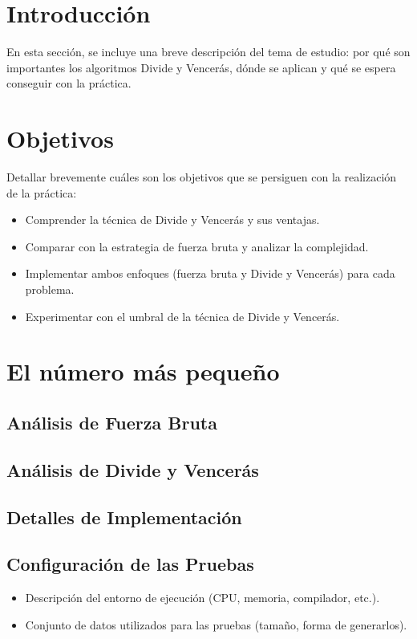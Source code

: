 \documentclass[a4paper,12pt]{article}
\begin{document}


\section{Introducción}
En esta sección, se incluye una breve descripción del tema de estudio:
por qué son importantes los algoritmos Divide y Vencerás,
dónde se aplican y qué se espera conseguir con la práctica.

\section{Objetivos}
Detallar brevemente cuáles son los objetivos que se persiguen con la realización de la práctica:
\begin{itemize}
	\item Comprender la técnica de Divide y Vencerás y sus ventajas.
	\item Comparar con la estrategia de fuerza bruta y analizar la complejidad.
	\item Implementar ambos enfoques (fuerza bruta y Divide y Vencerás) para cada problema.
	\item Experimentar con el umbral de la técnica de Divide y Vencerás.
\end{itemize}

\section{El número más pequeño}
\subsection{Análisis de Fuerza Bruta}

\subsection{Análisis de Divide y Vencerás}

\subsection{Detalles de Implementación}

\subsection{Configuración de las Pruebas}
\begin{itemize}
	\item Descripción del entorno de ejecución (CPU, memoria, compilador, etc.).
	\item Conjunto de datos utilizados para las pruebas (tamaño, forma de generarlos).
\end{itemize}
\end{document}
